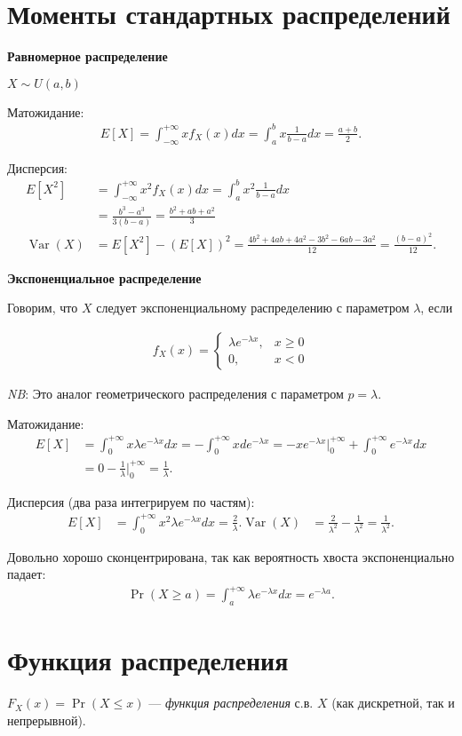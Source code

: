 \documentclass[12pt]{article}
\DeclareMathOperator{\Var}{Var}
\begin{document}
  \section{Моменты стандартных распределений}

  \textbf{Равномерное распределение}

  $X \sim U(a, b)$ 

  Матожидание:
  \begin{align*}
    E[X] = \int_{-\infty}^{+\infty} x f_X(x) dx = \int_{a}^{b} x \frac{1}{b - a} dx = \frac{a + b}{2}. 
  \end{align*}

  Дисперсия:
  \begin{align*}
    E[X^2] &= \int_{-\infty}^{+\infty} x^2 f_X(x) dx = \int_{a}^{b} x^2 \frac{1}{b - a} dx \\
           &= \frac{b^3 - a^3}{3(b - a)} = \frac{b^2 + ab + a^2}{3}\\
    \Var(X) &= E[X^2] - (E[X])^2 = \frac{4b^2 + 4ab + 4a^2 - 3b^2 - 6ab - 3a^2}{12} = \frac{(b - a)^2}{12}. 
  \end{align*}

  \textbf{Экспоненциальное распределение}

  Говорим, что $X$ следует экспоненциальному распределению с параметром $\lambda$, если

  \begin{align*}
    f_X(x) = \begin{cases}
      \lambda e^{-\lambda x}, &x \ge 0 \\
      0, &x < 0
    \end{cases}
  \end{align*}

  \emph{NB}: Это аналог геометрического распределения с параметром $p = \lambda$.

  Матожидание:
  \begin{align*}
    E[X] &= \int_0^{+\infty} x \lambda e^{-\lambda x} dx = - \int_0^{+\infty} x d e^{-\lambda x} = - x e^{-\lambda x} \bigg|_0^{+\infty} + \int_0^{+\infty} e^{-\lambda x} dx \\
    &= 0 - \frac{1}{\lambda} \bigg|_0^{+\infty} = \frac{1}{\lambda}.
  \end{align*}

  Дисперсия (два раза интегрируем по частям):
  \begin{align*}
    E[X] &= \int_0^{+\infty} x^2 \lambda e^{-\lambda x} dx = \frac{2}{\lambda}.
    \Var(X) &= \frac{2}{\lambda^2} - \frac{1}{\lambda^2} = \frac{1}{\lambda^2}.
  \end{align*}

  Довольно хорошо сконцентрирована, так как вероятность хвоста экспоненциально падает:
  \begin{align*}
    \Pr(X \ge a) = \int_a^{+\infty} \lambda e^{-\lambda x} dx = e^{-\lambda a}.
  \end{align*}


  \section{Функция распределения}

  $F_X(x) = \Pr(X \le x)$ --- \emph{функция распределения} с.в. $X$ (как дискретной, так и непрерывной).
\end{document}
